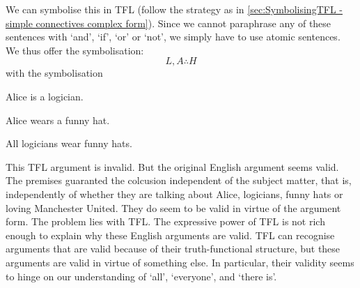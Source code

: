 We can symbolise this in TFL (follow the strategy as in \cref{sec:SymbolisingTFL - simple connectives complex form}). Since we cannot paraphrase any of these sentences with `and', `if', `or' or `not', we simply have to use atomic sentences. We thus offer the symbolisation:
$$L, A \therefore H$$
with the symbolisation
\begin{ekey}
\item[L] Alice is a logician.
\item[H] Alice wears a funny hat.
\item[A] All logicians wear funny hats.
\end{ekey}




This TFL argument is invalid. But the original English argument seems valid. The premises guaranted the colcusion independent of the subject matter, that is, independently of whether they are talking about Alice, logicians, funny hats or loving Manchester United. They do seem to be valid in virtue of the argument form. The problem lies with TFL.
The expressive power of TFL is not rich enough to explain why these English arguments are valid. TFL can recognise arguments that are valid because of their truth-functional structure, but these arguments are valid in virtue of something else. In particular, their validity seems to hinge on our understanding of `all', `everyone', and `there is'.




